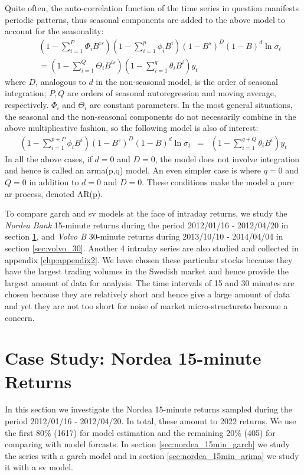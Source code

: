 \begin{enumerate}
Quite often, the auto-correlation function of the time series in
question manifests periodic patterns, thus seasonal components are
added to the above model to account for the seasonality:
\begin{eqnarray*}
&& (1 - \sum_{i=1}^P \Phi_i B^{is}) (1 - \sum_{i=1}^p \phi_i B^i) (1 - B^s)^D (1 -
B)^d\ln \sigma_t \\
&& = (1 - \sum_{i=1}^Q \Theta_i B^{is}) (1 -
\sum_{i=1}^q \theta_i B^i)y_t
\end{eqnarray*}
where $D$, analogous to $d$ in the non-seasonal model, is the order of
seasonal integration; $P, Q$ are orders of seasonal autoregression and
moving average, respectively. $\Phi_i$ and $\Theta_i$ are constant
parameters. In the most general situations, the seasonal and the
non-seasonal components do not necessarily combine in the above
multiplicative fashion, so the following model is also of interest:
\begin{eqnarray*}
(1 - \sum_{i=1}^{p+P} \phi_i B^i) (1 - B^s)^D(1 - B)^d \ln
\sigma_t &=& (1 - \sum_{i=1}^{q+Q} \theta_i B^i) y_t
\end{eqnarray*}
In all the above cases, if $d = 0$ and $D = 0$, the model does not
involve integration and hence is called an \gls{arma}(p,q) model. An
even simpler case is where $q = 0$ and $Q = 0$ in addition to $d = 0$
and $D = 0$. These conditions make the model a pure \gls{ar}
process, denoted AR(p).
\end{enumerate}

To compare \gls{garch} and \gls{sv} models at the face of intraday returns,
we study the {\it Nordea Bank} 15-minute returns during the period
2012/01/16 - 2012/04/20 in section \ref{chp:nordea_15min}, 
and {\it Volvo B} 30-minute returns during 2013/10/10 - 2014/04/04 in
section \ref{sec:volvo_30}. Another 4 intraday series are also studied and
collected in appendix \ref{chp:appendix2}. We have chosen these
particular stocks because they have the largest trading volumes in the
Swedish market and hence provide the largest amount of data for
analysis. The time intervals of 15 and 30 minutes are chosen because
they are relatively short and hence give a large amount of data and
yet they are not too short for noise of market
micro-structure\footnotemark to become a concern.

\section{Case Study: Nordea 15-minute Returns}
\label{chp:nordea_15min}
In this section we investigate the Nordea 15-minute returns sampled
during the period 2012/01/16 - 2012/04/20. In total, these amount to
2022 returns. We use the first 80\% (1617) for model estimation and  the
remaining 20\% (405) for comparing with model forcasts. In section
\ref{sec:nordea_15min_garch} we study the series with a \gls{garch} model 
and in section \ref{sec:nordea_15min_arima} we study it with a
\gls{sv} model.

